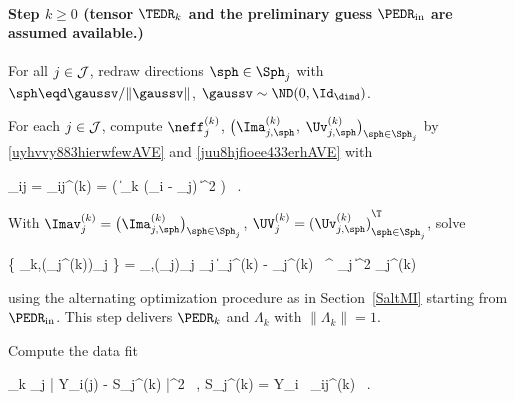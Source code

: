 \paragraph{Step \( k \geq 0 \) (tensor \( \TEDR_{k} \) and the preliminary guess \( \PEDR_{\init} \) are assumed 
available.)}

\begin{mylist}


\item
For all \( j \in \mathcal{J} \), 
redraw directions \( \sph \in \Sph_{j} \) with
\( \sph \eqd \gaussv/\| \gaussv \| \), \( \gaussv \sim \ND(0,\Id_{\dimd}) \).

\item 
For each \( j \in \mathcal{J} \), compute 
\( \neff_{j}^{(k)} \), \( \bigl( \Ima_{j,\sph}^{(k)} \), \( \Uv_{j,\sph}^{(k)} \bigr)_{\sph \in \Sph_{j}} \)
by \eqref{uyhvvy883hierwfewAVE} and \eqref{juu8hjfioee433erhAVE} with
\begin{EQA}[c]
	\weight_{ij} 
	= 
	\weight_{ij}^{(k)}
	= 
	\Kern\bigl( \| \TEDR_{k} (\Xv_{i} - \xv_{j}) \|^{2} \bigr) 
	\, .
\end{EQA}

\item 
With 
\( \Imav_{j}^{(k)} = \bigl( \Ima_{j,\sph}^{(k)} \bigr)_{\sph \in \Sph_{j}} \),
\( \UV_{j}^{(k)} = {(\Uv_{j,\sph}^{(k)})}_{\sph \in \Sph_{j}}^{\T} \),
solve
\begin{EQA}[c]
	\bigl\{ \PEDR_{k},(\fclv_{j}^{(k)})_{j \in \JJJ} \bigr\}
	=
	\arginf_{\PEDR,(\fclv_{j})_{j \in \JJJ}}
	\sum_{j \in \JJJ} \bigl\| \Imav_{j}^{(k)} - \UV_{j}^{(k)} \, \PEDR^{\T} \fclv_{j} \bigr\|^{2} \neff_{j}^{(k)}
	\, 
\end{EQA}
using the alternating optimization procedure as in Section~\ref{SaltMI} starting from 
\( \PEDR_{\init} \).
This step delivers \( \PEDR_{k} \) and \( \Lambda_{k} \) with \( \| \Lambda_{k} \| = 1 \).

\item 
Compute the data fit
\begin{EQA}[c]
	\err_{k}
	\eqdef
	\sum_{j \in \JJJ} \bigl| Y_{i(j)} - S_{j}^{(k)} \bigr|^{2}
	\, ,
\label{jvfujkiiiut5tyerjfdkmi}
	\qquad
	S_{j}^{(k)}
	=
	 \sumI Y_{i} \, \weight_{ij}^{(k)}
	\, .
\end{EQA}


\end{mylist}

